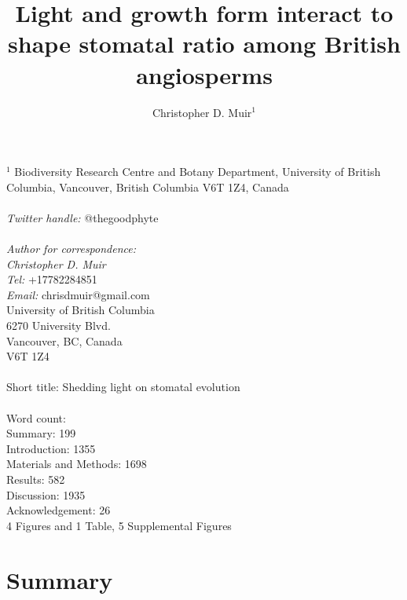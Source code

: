 \documentclass[12pt, oneside]{article}
\newcommand{\stretchy}{1.5}
\begin{document}


\title{Light and growth form interact to shape stomatal ratio among British angiosperms}
\author{Christopher D. Muir$^1$}
\date{} %

\maketitle

$^1$ Biodiversity Research Centre and Botany Department, University of British Columbia, Vancouver, British Columbia V6T 1Z4, Canada \\
\\
\textit{Twitter handle:} @thegoodphyte \\
\\
\textit{Author for correspondence:} \\
\textit{Christopher D. Muir} \\
\textit{Tel:} +17782284851 \\
\textit{Email:} chrisdmuir@gmail.com \\
University of British Columbia \\
6270 University Blvd. \\
Vancouver, BC, Canada \\
V6T 1Z4 \\
\\
Short title: Shedding light on stomatal evolution\\
\\
Word count: \\
Summary: 199\\
Introduction: 1355\\
Materials and Methods: 1698\\
Results: 582\\
Discussion: 1935\\
Acknowledgement: 26\\
4 Figures and 1 Table, 5 Supplemental Figures




\section*{Summary}
\end{document}
